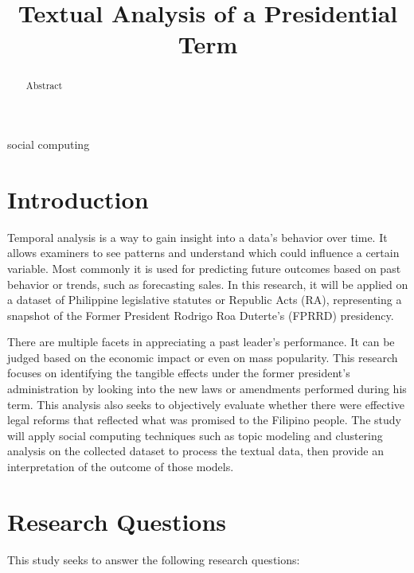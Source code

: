 \documentclass[conference]{IEEEtran}
\begin{document}
\title{Textual Analysis of a Presidential Term}

\author{
}

\maketitle

\begin{abstract}
Abstract
\end{abstract}

\begin{IEEEkeywords}
social computing
\end{IEEEkeywords}

\section{Introduction}
Temporal analysis is a way to gain insight into a data's behavior over time. It allows examiners to see patterns and understand which could influence a certain variable. Most commonly it is used for predicting future outcomes based on past behavior or trends, such as forecasting sales. In this research, it will be applied on a dataset of Philippine legislative statutes or Republic Acts (RA), representing a snapshot of the Former President Rodrigo Roa Duterte's (FPRRD) presidency.

There are multiple facets in appreciating a past leader's performance. It can be judged based on the economic impact or even on mass popularity. This research focuses on identifying the tangible effects under the former president's administration by looking into the new laws or amendments performed during his term. This analysis also seeks to objectively evaluate whether there were effective legal reforms that reflected what was promised to the Filipino people. The study will apply social computing techniques such as topic modeling and clustering analysis on the collected dataset to process the textual data, then provide an interpretation of the outcome of those models.

\section{Research Questions}
This study seeks to answer the following research questions:
\end{document}
